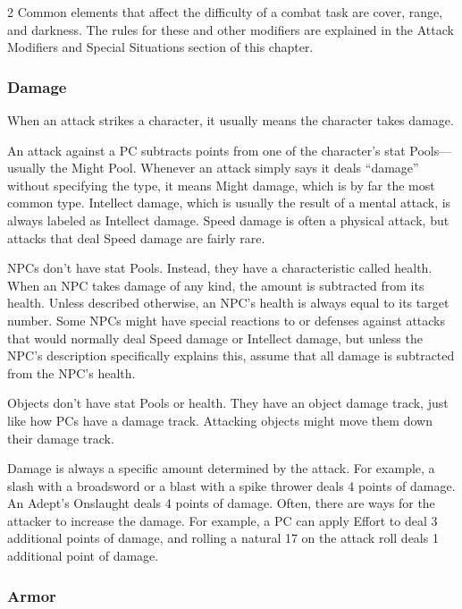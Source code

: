 \begin{multicols}{2}
Common elements that affect the difficulty of a combat task are cover, range, and darkness. The rules for these and other modifiers are explained in the Attack Modifiers and Special Situations section of this chapter.

\subsubsection{Damage}

When an attack strikes a character, it usually means the character takes damage.

An attack against a PC subtracts points from one of the character’s stat Pools—usually the Might Pool. Whenever an attack simply says it deals “damage” without specifying the type, it means Might damage, which is by far the most common type. Intellect damage, which is usually the result of a mental attack, is always labeled as Intellect damage. Speed damage is often a physical attack, but attacks that deal Speed damage are fairly rare.

NPCs don’t have stat Pools. Instead, they have a characteristic called health. When an NPC takes damage of any kind, the amount is subtracted from its health. Unless described otherwise, an NPC’s health is always equal to its target number. Some NPCs might have special reactions to or defenses against attacks that would normally deal Speed damage or Intellect damage, but unless the NPC’s description specifically explains this, assume that all damage is subtracted from the NPC’s health.

Objects don’t have stat Pools or health. They have an object damage track, just like how PCs have a damage track. Attacking objects might move them down their damage track.

Damage is always a specific amount determined by the attack. For example, a slash with a broadsword or a blast with a spike thrower deals 4 points of damage. An Adept’s Onslaught deals 4 points of damage. Often, there are ways for the attacker to increase the damage. For example, a PC can apply Effort to deal 3 additional points of damage, and rolling a natural 17 on the attack roll deals 1 additional point of damage.

\subsubsection{Armor}


\end{multicols}
